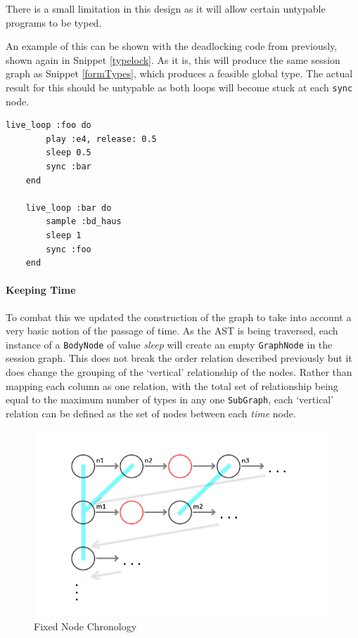 \documentclass[11pt, abstracton, twoside, titlepage=true]{scrartcl}
\begin{document}
There is a small limitation in this design as it will allow certain untypable
programs to be typed.

An example of this can be shown with the deadlocking code from previously,
shown again in Snippet \ref{typelock}. As it is, this will produce the same session
graph as Snippet \ref{formTypes}, which produces a feasible global type.
The actual result for this should be untypable as both loops will become stuck
at each \texttt{sync} node. 

\begin{minipage}{\textwidth}
	\begin{lstlisting}[style = sonicpi]
	live_loop :foo do
	    play :e4, release: 0.5
	    sleep 0.5
	    sync :bar
	end

	live_loop :bar do
	    sample :bd_haus
	    sleep 1
	    sync :foo
	end
	\end{lstlisting}
	 \label{typelock}
\end{minipage}

\paragraph{Keeping Time}
To combat this we updated the construction of the graph to take into account
a very basic notion of the passage of time. As the AST is being traversed, each
instance of a \texttt{BodyNode} of value \emph{sleep} will create an empty
\texttt{GraphNode} in the session graph. This does not break the order relation
described previously but it does change the grouping of the `vertical' 
relationship of the nodes. Rather than mapping each column as one relation, with
the total set of relationship being equal to the maximum number of types in
any one \texttt{SubGraph}, each `vertical' relation can be defined as the
set of nodes between each \emph{time} node.

\begin{figure}[h!]
	\centering
	\includegraphics[width=\textwidth]{images/GraphTwo.jpg}
	\caption{Fixed Node Chronology}
\end{figure}
\end{document}
